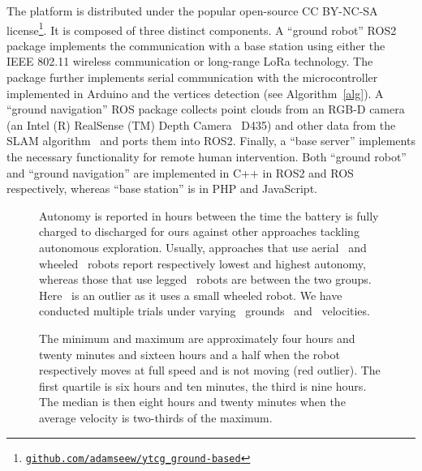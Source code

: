 \documentclass[lettersize,journal]{IEEEtran}
\theoremstyle{definition}
\begin{document}
The %
platform
is distributed under the popular open-source CC BY-NC-SA license\footnote{{\tt\footnotesize \href{https://github.com/adamseew/ytcg_ground-based}{github.com/adamseew/ytcg\_ground-based}}}. It is composed of three distinct components. A ``ground robot'' ROS2~\cite{quigley2009ros} package implements the communication with a base station using either the IEEE 802.11 wireless communication or long-range LoRa technology. The package further implements serial communication with the microcontroller implemented in Arduino and the vertices detection (see Algorithm~\ref{alg}). A ``ground navigation'' ROS package collects point clouds from an RGB-D camera (an Intel (R) RealSense (TM) Depth Camera~\cite{keselman2017intel} D435) and other data from the SLAM algorithm~\cite{labbe2019rtab} and ports them into ROS2. Finally, a ``base server'' implements the necessary functionality for remote human intervention.
Both ``ground robot'' and ``ground navigation'' are implemented in C++ in ROS2 and ROS respectively, whereas ``base station'' is in PHP and JavaScript.

\begin{figure}[t]
  \vspace*{-.6cm}
  \begin{minipage}[t]{0.57\columnwidth}
    \hspace*{-.5cm}
    
  \end{minipage}\hfill
  \begin{minipage}[t]{0.42\columnwidth}
    \vspace*{-5.1cm}
    \centering
    \caption{Autonomy is reported in hours between the time the battery is fully charged to discharged for ours against other approaches tackling autonomous exploration. 
    Usually, approaches that use aerial~\cite{schmid2020efficient,kulkarni2022autonomous} and wheeled~\cite{muller2021openbot,roucek2020darpa,surmann2003autonomous} robots report respectively lowest and highest autonomy, whereas those that use legged~\cite{kulkarni2022autonomous,tranzatto2022cerberus} robots are between the two groups. Here~\cite{muller2021openbot} is an outlier as it uses a small wheeled robot. We have conducted multiple trials under varying ~grounds ~and ~velocities.}
    \label{fig}
  \end{minipage}
  \vspace*{-.68cm}
  \caption*{The minimum and maximum are approximately four hours and twenty minutes and sixteen hours and a half when the robot respectively moves at full speed and is not moving (red outlier). The first quartile is six hours and ten minutes, the third is nine hours. The median is then eight hours and twenty minutes when the average velocity is two-thirds of the maximum.}
\end{figure}
\end{document}

